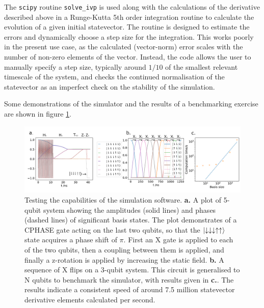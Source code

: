 \documentclass{report}
\begin{document}
The \texttt{scipy} routine \texttt{solve\_ivp} is used along with the calculations of the derivative described above in a Runge-Kutta 5th order \cite{Butcher1996} integration routine to calculate the evolution of a given initial statevector. The routine is designed to estimate the errors and dynamically choose a step size for the integration. This works poorly in the present use case, as the calculated (vector-norm) error scales with the number of non-zero elements of the vector. Instead, the code allows the user to manually specify a step size, typically around $1/10$ of the smallest relevant timescale of the system, and checks the continued normalisation of the statevector as an imperfect check on the stability of the simulation.

Some demonstrations of the simulator and the results of a benchmarking exercise are shown in figure \ref{fig:benchmark}. 
\begin{figure}[h]
    \centering
    \includegraphics[scale = 0.85]{Figures/benchmark/benchmarks.pdf}
    \caption{Testing the capabilities of the simulation software. \textbf{a.} A plot of 5-qubit system showing the amplitudes (solid lines) and phases (dashed lines) of significant basis states. The plot demonstrates of a CPHASE gate acting on the last two qubits, so that the $\ket{\downarrow\downarrow\downarrow\uparrow\uparrow}$ state acquires a phase shift of $\pi$. First an X gate is applied to each of the two qubits, then a coupling between them is applied, and finally a z-rotation is applied by increasing the static field\protect\footnotemark. \textbf{b.} A sequence of X flips on a 3-qubit system. This circuit is generalised to N qubits to benchmark the simulator, with results given in \textbf{c.}. The results indicate a consistent speed of around 7.5 million statevector derivative elements calculated per second.}
    \label{fig:benchmark}
\end{figure}
\end{document}
